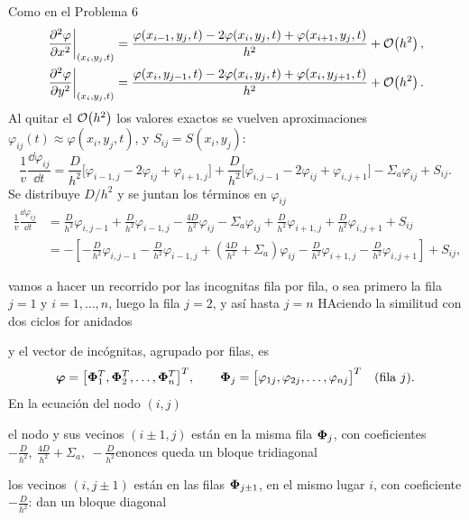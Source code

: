 Como en el Problema 6
\begin{align*}
	\left.\frac{\partial^2\varphi}{\partial x^2}\right|_{(x_i, y_j, t)}
	&= \frac{\varphi(x_{i-1}, y_j, t) - 2\varphi(x_i, y_j, t) + \varphi(x_{i+1}, y_j, t)}{h^2} + \mathcal{O}\!\left(h^2\right),\\
	\left.\frac{\partial^2\varphi}{\partial y^2}\right|_{(x_i, y_j, t)}
	&= \frac{\varphi(x_i, y_{j-1}, t) - 2\varphi(x_i, y_j, t) + \varphi(x_i, y_{j+1}, t)}{h^2} + \mathcal{O}\!\left(h^2\right).
\end{align*}
Al quitar el $\mathcal{O}\!\left(h^2\right)$ los valores exactos se vuelven aproximaciones
$\varphi_{ij}(t) \approx \varphi(x_i, y_j, t)$, y $S_{ij} = S(x_i, y_j)$:
\[
\frac1v\frac{\dd\varphi_{ij}}{\dd t}
= \frac{D}{h^2}\big[\varphi_{i-1,j} - 2\varphi_{ij} + \varphi_{i+1,j}\big]
+ \frac{D}{h^2}\big[\varphi_{i,j-1} - 2\varphi_{ij} + \varphi_{i,j+1}\big]
- \Sigma_a\varphi_{ij} + S_{ij}.
\]
Se distribuye $D/h^2$ y se juntan los términos en $\varphi_{ij}$ 
\begin{align*}
	\frac1v\frac{\dd\varphi_{ij}}{\dd t}
	&= \frac{D}{h^2}\varphi_{i,j-1} + \frac{D}{h^2}\varphi_{i-1,j} - \frac{4D}{h^2}\varphi_{ij} - \Sigma_a\varphi_{ij}
	+ \frac{D}{h^2}\varphi_{i+1,j} + \frac{D}{h^2}\varphi_{i,j+1} + S_{ij}\\
	&= -\left[-\frac{D}{h^2}\varphi_{i,j-1} - \frac{D}{h^2}\varphi_{i-1,j}
	+ \left(\frac{4D}{h^2} + \Sigma_a\right)\varphi_{ij}
	- \frac{D}{h^2}\varphi_{i+1,j} - \frac{D}{h^2}\varphi_{i,j+1}\right] + S_{ij},
\end{align*}


vamos a hacer un recorrido por las incognitas fila por fila, o sea  primero la fila $j = 1$ y $i = 1, \dots, n$, luego la fila $j = 2$,
y así hasta $j = n$ HAciendo la similitud con dos ciclos for anidados

y el vector de incógnitas, agrupado por filas, es
\[
\bm{\varphi} = \big[\bm{\Phi}_1^T, \bm{\Phi}_2^T, \dots, \bm{\Phi}_n^T\big]^T,
\qquad
\bm{\Phi}_j = \big[\varphi_{1j}, \varphi_{2j}, \dots, \varphi_{nj}\big]^T \quad (\text{fila } j).
\]
En la ecuación del nodo $(i, j)$ 

 el nodo y sus vecinos $(i\pm1, j)$ están en la misma fila $\bm{\Phi}_j$, con coeficientes
	$-\frac{D}{h^2},\ \frac{4D}{h^2} + \Sigma_a,\ -\frac{D}{h^2}$enonces queda un bloque tridiagonal

los vecinos $(i, j\pm1)$ están en las filas $\bm{\Phi}_{j\pm1}$, en el mismo lugar $i$, con coeficiente
	$-\frac{D}{h^2}$: dan un bloque diagonal
	
